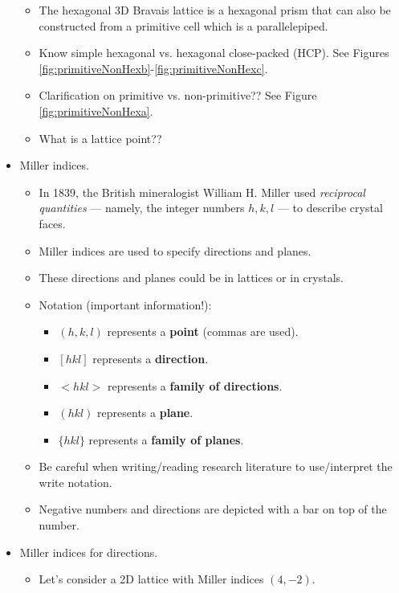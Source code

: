 \documentclass[../notes.tex]{subfiles}
\begin{document}
\begin{itemize}
\begin{itemize}
        \item The hexagonal 3D Bravais lattice is a hexagonal prism that can also be constructed from a primitive cell which is a parallelepiped.
        \item Know simple hexagonal vs. hexagonal close-packed (HCP). See Figures \ref{fig:primitiveNonHexb}-\ref{fig:primitiveNonHexc}.
        \item Clarification on primitive vs. non-primitive?? See Figure \ref{fig:primitiveNonHexa}.
        \item What is a lattice point??
    \end{itemize}
    \item Miller indices.
    \begin{itemize}
        \item In 1839, the British mineralogist William H. Miller used \emph{reciprocal quantities} --- namely, the integer numbers $h,k,l$ --- to describe crystal faces.
        \item Miller indices are used to specify directions and planes.
        \item These directions and planes could be in lattices or in crystals.
        \item Notation (important information!):
        \begin{itemize}
            \item $(h,k,l)$ represents a \textbf{point} (commas are used).
            \item $[hkl]$ represents a \textbf{direction}.
            \item $<hkl>$ represents a \textbf{family of directions}.
            \item $(hkl)$ represents a \textbf{plane}.
            \item $\{hkl\}$ represents a \textbf{family of planes}.
        \end{itemize}
        \item Be careful when writing/reading research literature to use/interpret the write notation.
        \item Negative numbers and directions are depicted with a bar on top of the number.
    \end{itemize}
    \item Miller indices for directions.
    \begin{itemize}
        \item Let's consider a 2D lattice with Miller indices $(4,-2)$.
        \begin{itemize}

\end{itemize}
\end{itemize}
\end{itemize}
\end{document}
